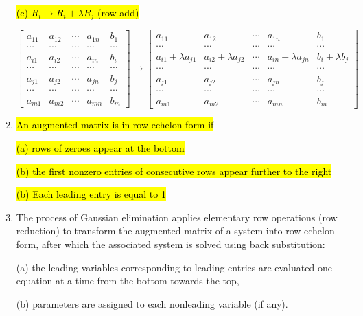 \documentclass[10pt]{article}
\begin{document}
\begin{enumerate}
\hl{(c) $R_{i} \mapsto R_{i}+\lambda R_{j}$ (row add)}

$$
\left[\begin{array}{cccc|c}
a_{11} & a_{12} & \cdots & a_{1 n} & b_{1} \\
\cdots & \cdots & \cdots & \cdots & \cdots \\
a_{i 1} & a_{i 2} & \cdots & a_{i n} & b_{i} \\
\cdots & \cdots & \cdots & \cdots & \cdots \\
a_{j 1} & a_{j 2} & \cdots & a_{j n} & b_{j} \\
\cdots & \cdots & \cdots & \cdots & \cdots \\
a_{m 1} & a_{m 2} & \cdots & a_{m n} & b_{m}
\end{array}\right] \longrightarrow\left[\begin{array}{cccc|c}
a_{11} & a_{12} & \cdots & a_{1 n} & b_{1} \\
\cdots & \cdots & \cdots & \cdots & \cdots \\
a_{i 1}+\lambda a_{j 1} & a_{i 2}+\lambda a_{j 2} & \cdots & a_{i n}+\lambda a_{j n} & b_{i}+\lambda b_{j} \\
\cdots & \cdots & \cdots & \cdots & \cdots \\
a_{j 1} & a_{j 2} & \cdots & a_{j n} & b_{j} \\
\cdots & \cdots & \cdots & \cdots & \cdots \\
a_{m 1} & a_{m 2} & \cdots & a_{m n} & b_{m}
\end{array}\right]
$$

\item \hl{An augmented matrix is in row echelon form if}

\hl{(a) rows of zeroes appear at the bottom}

\hl{(b) the first nonzero entries of consecutive rows appear further to the right}

\hl{(b) Each leading entry is equal to 1}

\item The process of Gaussian elimination applies elementary row operations (row reduction) to transform the augmented matrix of a system into row echelon form, after which the associated system is solved using back substitution:

(a) the leading variables corresponding to leading entries are evaluated one equation at a time from the bottom towards the top,

(b) parameters are assigned to each nonleading variable (if any).


\end{enumerate}
\end{document}

